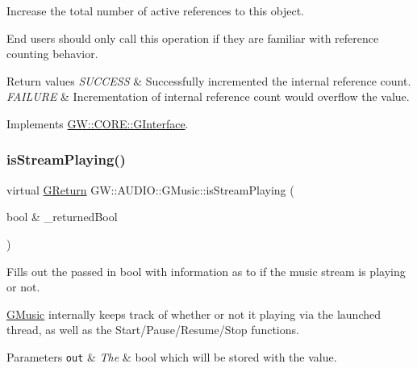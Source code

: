 Increase the total number of active references to this object. 

End users should only call this operation if they are familiar with reference counting behavior.


\begin{DoxyRetVals}{Return values}
{\em S\+U\+C\+C\+E\+SS} & Successfully incremented the internal reference count. \\
\hline
{\em F\+A\+I\+L\+U\+RE} & Incrementation of internal reference count would overflow the value. \\
\hline
\end{DoxyRetVals}


Implements \mbox{\hyperlink{class_g_w_1_1_c_o_r_e_1_1_g_interface_a2d710f20bb78e544e8309b5b75c21260}{G\+W\+::\+C\+O\+R\+E\+::\+G\+Interface}}.

\mbox{\label{class_g_w_1_1_a_u_d_i_o_1_1_g_music_a0a0f4d5e0d11f7aec7ed9a1a6371df1a}} 
\subsubsection{\texorpdfstring{is\+Stream\+Playing()}{isStreamPlaying()}}
{\footnotesize\ttfamily virtual \mbox{\hyperlink{namespace_g_w_a67a839e3df7ea8a5c5686613a7a3de21}{G\+Return}} G\+W\+::\+A\+U\+D\+I\+O\+::\+G\+Music\+::is\+Stream\+Playing (\begin{DoxyParamCaption}\item[{bool \&}]{\+\_\+returned\+Bool }\end{DoxyParamCaption})\hspace{0.3cm}{\ttfamily [pure virtual]}}



Fills out the passed in bool with information as to if the music stream is playing or not. 

\mbox{\hyperlink{class_g_w_1_1_a_u_d_i_o_1_1_g_music}{G\+Music}} internally keeps track of whether or not it playing via the launched thread, as well as the Start/\+Pause/\+Resume/\+Stop functions.


\begin{DoxyParams}[1]{Parameters}
\mbox{\tt out}  & {\em The} & bool which will be stored with the value.\\
\hline
\end{DoxyParams}

